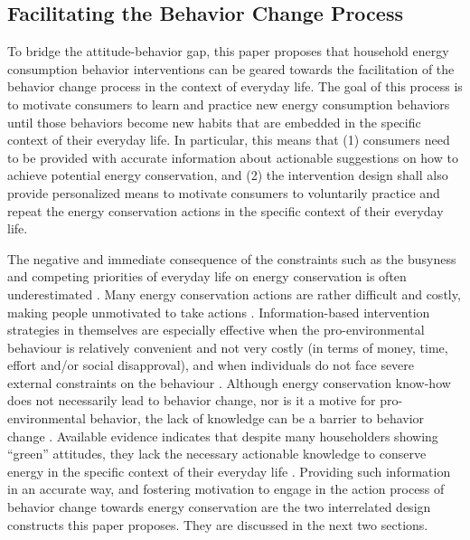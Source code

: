 \documentclass[a4paper,10pt]{article}
\begin{document}
\subsection{Facilitating the Behavior Change Process}
\label{sec:bridgingGap:facilitatingProcess}

To bridge the attitude-behavior gap, this paper proposes that household energy consumption behavior interventions can be geared towards the facilitation of the behavior change process in the context of everyday life. The goal of this process is to motivate consumers to learn and practice new energy consumption behaviors until those behaviors become new habits that are embedded in the specific context of their everyday life. In particular, this means that (1) consumers need to be provided with accurate information about actionable suggestions on how to achieve potential energy conservation, and (2) the intervention design shall also provide personalized means to motivate consumers to voluntarily practice and repeat the energy conservation actions in the specific context of their everyday life.

The negative and immediate consequence of the constraints such as the busyness and competing priorities of everyday life on energy conservation is often underestimated \citep{Berthou2013,Burchell2014,Dillahunt2014,Strengers2014}. Many energy conservation actions are rather difficult and costly, making people unmotivated to take actions \citep{Fogg2009,ockwell2009reorienting,Petkov2011,corradi2013oops}. Information-based intervention strategies in themselves are especially effective when the pro-environmental behaviour is relatively convenient and not very costly (in terms of money, time, effort and/or social disapproval), and when individuals do not face severe external constraints on the behaviour \citep{Steg2009}.  Although energy conservation know-how does not necessarily lead to behavior change, nor is it a motive for pro-environmental behavior, the lack of knowledge can be a barrier to behavior change \citep{Schultz2002}. Available evidence 
indicates that despite many householders showing ``green'' attitudes, they lack the necessary actionable knowledge to conserve energy in the specific context of their everyday life \citep{Gardner2008}. Providing such information in an accurate way, and fostering motivation to engage in the action process of behavior change towards energy conservation are the two interrelated design constructs this paper proposes. They are discussed in the next two sections. 
\end{document}

